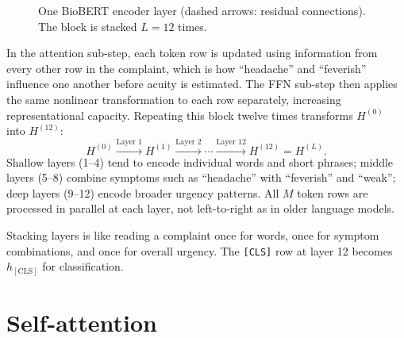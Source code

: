 \begin{figure}[H]
\centering
{}
\caption{One BioBERT encoder layer (dashed arrows: residual connections). The block is stacked $L=12$ times.}
\label{fig:encoder-layer}
\end{figure}

In the attention sub-step, each token row is updated using information from every other row in the complaint, which is how ``headache'' and ``feverish'' influence one another before acuity is estimated. The FFN sub-step then applies the same nonlinear transformation to each row separately, increasing representational capacity. Repeating this block twelve times transforms \(H^{(0)}\) into \(H^{(12)}\):
\[
  H^{(0)} \xrightarrow{\text{Layer 1}} H^{(1)} \xrightarrow{\text{Layer 2}} \cdots \xrightarrow{\text{Layer 12}} H^{(12)} = H^{(L)}.
\]
Shallow layers (1--4) tend to encode individual words and short phrases; middle layers (5--8) combine symptoms such as ``headache'' with ``feverish'' and ``weak''; deep layers (9--12) encode broader urgency patterns. All \(M\) token rows are processed in parallel at each layer, not left-to-right as in older language models.

\begin{remark}
Stacking layers is like reading a complaint once for words, once for symptom combinations, and once for overall urgency. The \texttt{[CLS]} row at layer 12 becomes \(h_{\mathrm{[CLS]}}\) for classification.
\end{remark}

\section{Self-attention}
\label{sec:attention}

